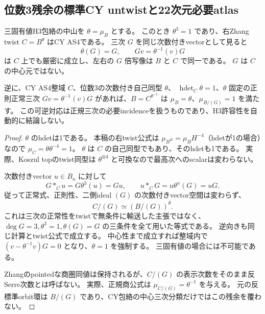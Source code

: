 \subsection{位数3残余の標準CY untwistと22次元必要atlas}
\label{subsec:cubic-third-root-CY-incidence}
\begin{proposition}[位数3の正常三次incidenceの可逆なCY還元]
\label{prop:cubic-third-root-CY-incidence}
三固有値H3包絡の中山を $\theta=\mu_B$ とする。
このとき $\theta^3=1$ であり、右Zhang twist $C=B^\theta$ はCY AS4である。
三次 $G$ を同じ次数付きvectorとして見ると
\[
 \theta(G)=G,\qquad Gv=\theta^{-1}(v)G
\]
は $C$ 上でも厳密に成立し、左右の $G$ 倍写像は $B$ と $C$ で同一である。
$G$ は $C$ の中心元ではない。

逆に、CY AS4整域 $C$、位数3の次数付き自己同型 $\theta$、
$\operatorname{hdet}_C\theta=1$、$\theta$ 固定の正則正常三次
$Gv=\theta^{-1}(v)G$ があれば、$B=C^{\theta^{-1}}$ は
$\mu_B=\theta$、$\mu_{B/(G)}=1$ を満たす。
この可逆対応は正規三次の必要incidenceを扱うものであり、H3許容性を自動的に結論しない。
\end{proposition}
\begin{proof}
$\theta$ のhdetは1である。
本稿の右twist公式は $\mu_{B^H}=\mu_BH^{-4}$（hdetが1の場合）なので
$\mu_C=\theta\theta^{-4}=1$。
$\theta$ は $C$ の自己同型でもあり、そのhdetも1である。
実際、Koszul topのtwist同型は $\theta^{\otimes4}$ と可換なので最高次へのscalarは変わらない。

次数付きvector $u\in B_n$ に対して
\[
 G*_C u=G\theta^3(u)=Gu,\qquad
 u*_C G=u\theta^n(G)=uG.
\]
従って正常式、正則性、二側ideal $(G)$ の次数付きvector空間は変わらず、
\[
 C/(G)\simeq (B/(G))^{\bar\theta}.
\]
これは三次の正常性をtwistで無条件に輸送した主張ではなく、
$\deg G=3,\theta^3=1,\theta(G)=G$ の三条件を全て用いた等式である。
逆向きも同じ計算とtwist公式で成立する。
中心性まで成立すれば整域内で $(v-\theta^{-1}v)G=0$ となり、$\theta=1$ を強制する。
三固有値の場合には不可能である。

Zhangのpointedな商圏同値は保持されるが、$C/(G)$ の表示次数をそのまま反Serre次数とは呼ばない。
実際、正規商公式は $\mu_{C/(G)}=\theta^{-1}$ を与える。
元の反標準orbit環は $B/(G)$ であり、CY包絡の中心三次分類だけではこの残余を覆わない。
\end{proof}

